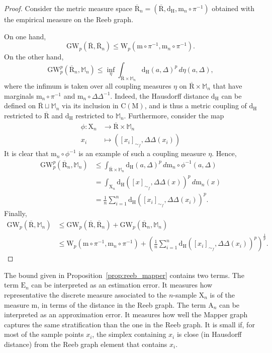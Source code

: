 \documentclass[pdflatex,sn-mathphys-ay]{sn-jnl}%
\newcommand{\reeb}{\mathrm{R}}
\newcommand{\man}{\mathrm{M}}
\newcommand{\sample}{\mathrm{X}}
\newcommand{\mes}{\mathrm{m}}
\newcommand{\wasser}{\mathrm{W}}
\newcommand{\gromov}{\mathrm{GW}}
\newcommand{\comp}{{\mathrm {C}}}
\newcommand{\appr}{{\mathrm {A}}}
\newcommand{\estim}{{\mathrm {E}}}
\newcommand{\haus}{{\mathrm {d_H}}}
\newcommand{\mapper}{{\mathbb{M}_n}}
\newcommand{\simp}{\Delta}
\newcommand{\DD}{\Delta\!\!\!\!\Delta}
\newcommand{\diracn}{\mathrm{m}_n}
\theoremstyle{thmstyleone}%
\begin{document}
 \begin{proof}
 Consider the metric measure space $\overline{\reeb}_n=(\overline{\reeb},\haus,\diracn\circ\pi^{-1})$ obtained with the empirical measure on the Reeb graph.
 
 On one hand,
$$\gromov_p(\overline{\reeb},\overline{\reeb}_n)\leq\wasser_p(\mes\circ\pi^{-1},\diracn\circ\pi^{-1}).$$
%
On the other hand, 
%
$$\gromov_p^p(\overline{\reeb}_n,\mapper)\leq \inf_{\eta}\int_{\overline{\reeb}\times\mapper}\haus(a,\simp)^p\,d\eta(a,\simp),$$
%
 where the infimum is taken over all coupling measures $\eta$ on $\overline{\reeb}\times\mapper$ that have marginals $\diracn\circ\pi^{-1}$ and $\diracn\circ\DD^{-1}$. Indeed, the Hausdorff distance $\haus$ can be defined on $\overline{\reeb}\sqcup\mapper$ via its inclusion in $\comp(\man)$, and is thus a metric coupling of $\haus$ restricted to $\overline{\reeb}$ and $\haus$ restricted to $\mapper$. Furthermore, consider the map
 \begin{align*}
     \phi\colon\sample_n&\longrightarrow\overline{\reeb}\times\mapper\\
     x_i&\longmapsto([x_i]_{\sim_f},\DD(x_i))
 \end{align*}
 It is clear that $\diracn\circ\phi^{-1}$ is an example of such a coupling measure $\eta$. Hence,
 \begin{align*}
    \gromov_p^p(\overline{\reeb}_n,\mapper)&\leq \int_{\overline{\reeb}\times\mapper}\haus(a,\simp)^p\,d\diracn\circ\phi^{-1}(a,\simp) \\
    &=\int_{\sample_n}\haus([x]_{\sim_f},\DD(x))^p\,d\diracn(x)\\
    &=\frac{1}{n}\sum_{i=1}^n\haus([x_i]_{\sim_f},\DD(x_i))^p.
 \end{align*}
Finally,
  \begin{align*}
    \gromov_p(\overline{\reeb},\mapper)&\leq \gromov_p(\overline{\reeb},\overline{\reeb}_n)+\gromov_p(\overline{\reeb}_n,\mapper)\\
    &\leq\wasser_p(\mes\circ\pi^{-1},\diracn\circ\pi^{-1})+\left(\frac{1}{n}\sum_{i=1}^n\haus([x_i]_{\sim_f},\DD(x_i))^p\right)^{\frac{1}{p}}.
 \end{align*}
 \end{proof}
  The bound given in Proposition~\ref{prop:reeb_mapper} contains two terms. The term $\estim_n$ can be interpreted as an estimation error. It measures how representative the discrete measure associated to the $n$-sample $\sample_n$ is of the measure $\mes$, in terms of the distance in the Reeb graph. The term $\appr_n$ can be interpreted as an approximation error. It measures how well the Mapper graph captures the same stratification than the one in the Reeb graph. It is small if, for most of the sample points $x_i$, the simplex containing $x_i$ is close (in Hausdorff distance) from the Reeb graph element that contains $x_i$.
\end{document}
